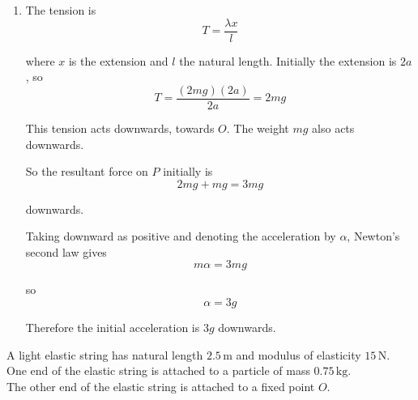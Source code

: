 \documentclass[leqno]{article}
\begin{document}
\begin{enumerate}[
  label=\textbf{\arabic*.},
  leftmargin=*,
  topsep=0pt,
  partopsep=0pt,
  parsep=0pt
]
\begin{djsSolution}
\begin{enumerate}[label=\textbf{(\alph*)}, start=1]
where \(x\) is the extension and \(l\) the natural length. Here \(\lambda=2mg\) and \(l=2a\), and initially \(x=2a\), so
\[
EPE_0=\frac{(2mg)(2a)^2}{2(2a)}=2mga
\]

Take the position in state \(1\) as the zero level for gravitational potential energy. From state \(0\) to state \(1\), \(P\) falls \(4a-\frac{3}{2}a=\frac{5}{2}a\), so
\[
GPE_0=mg\left(\frac{5a}{2}\right)=\frac52 mga,\qquad GPE_1=0
\]

Also
\[
KE_1=\frac12 mv^2,\qquad EPE_1=0
\]

So
\begin{align*}
0+\frac52 mga+2mga+0&=\frac12 mv^2+0+0 \\
\frac12 mv^2&=\frac92 mga
\end{align*}

Hence
\[
v^2=9ag
\]

so
\[
v=3\sqrt{ag}
\]


  \item The tension is
\[
T=\frac{\lambda x}{l}
\]

where \(x\) is the extension and \(l\) the natural length. Initially the extension is $2a$, so
\[
T=\frac{(2mg)(2a)}{2a}=2mg
\]

This tension acts downwards, towards $O$. The weight $mg$ also acts downwards.

So the resultant force on $P$ initially is
\[
2mg+mg=3mg
\]

downwards.

Taking downward as positive and denoting the acceleration by $\alpha$, Newton's second law gives
\[
m\alpha=3mg
\]

so
\[
\alpha=3g
\]

Therefore the initial acceleration is $3g$ downwards.
\end{enumerate}
\end{djsSolution}


\newpage

\questionitem

A light elastic string has natural length $2.5\,\mathrm{m}$ and modulus of elasticity $15\,\mathrm{N}$. \\

One end of the elastic string is attached to a particle of mass $0.75\,\mathrm{kg}$. \\

The other end of the elastic string is attached to a fixed point $O$. \\


\end{enumerate}
\end{document}
